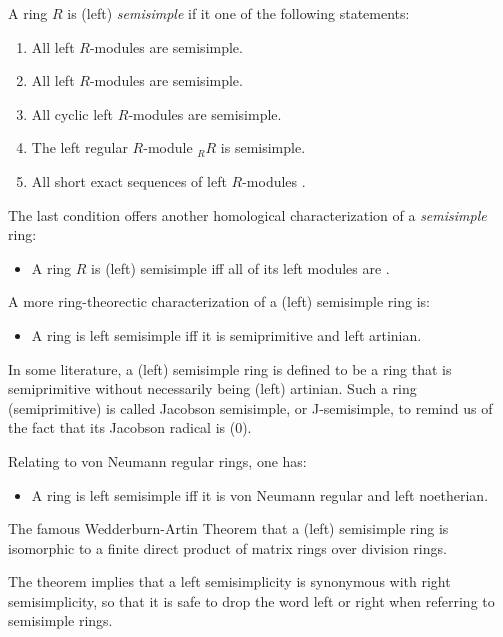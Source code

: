 \documentclass[12pt]{article}
\begin{document}
A ring $R$ is (left) \emph{semisimple} if it  one of the following  statements:
\begin{enumerate}
\item
All left $R$-modules are semisimple.
\item
All  left $R$-modules are semisimple.
\item
All cyclic left $R$-modules are semisimple.
\item
The left regular $R$-module $_RR$ is semisimple.
\item
All short exact sequences of left $R$-modules .
\end{enumerate}

The last  condition offers another homological characterization of a \emph{semisimple} ring:

\begin{itemize}
\item
A ring $R$ is (left) semisimple iff all of its left modules are .
\end{itemize}

A more ring-theorectic characterization of a (left) semisimple ring is:

\begin{itemize}
\item
A ring is left semisimple iff it is semiprimitive and left artinian.
\end{itemize}

In some literature, a (left) semisimple ring is defined to be a ring that is semiprimitive without necessarily being (left) artinian.  Such a ring (semiprimitive) is called Jacobson semisimple, or J-semisimple, to remind us of the fact that its Jacobson radical is (0).

Relating to von Neumann regular rings, one has:

\begin{itemize}
\item
A ring is left semisimple iff it is von Neumann regular and left noetherian.
\end{itemize}

The famous Wedderburn-Artin Theorem  that a (left) semisimple ring is isomorphic to a finite direct product of matrix rings over division rings.

The theorem implies that a left semisimplicity is synonymous with right semisimplicity, so that it is safe to drop the word left or right when referring to semisimple rings.
\end{document}
